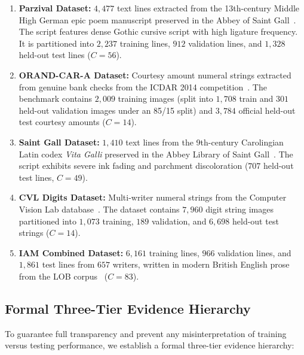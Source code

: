 \documentclass{IEEEtran}
\begin{document}
\begin{enumerate}

    \item \textbf{Parzival Dataset:} $4,477$ text lines extracted from the 13th-century Middle High German epic poem manuscript preserved in the Abbey of Saint Gall~\cite{fischer2012groundtruth}. The script features dense Gothic cursive script with high ligature frequency. It is partitioned into $2,237$ training lines, $912$ validation lines, and $1,328$ held-out test lines ($C=56$).

    \item \textbf{ORAND-CAR-A Dataset:} Courtesy amount numeral strings extracted from genuine bank checks from the ICDAR 2014 competition~\cite{koerich2014}. The benchmark contains $2,009$ training images (split into $1,708$ train and $301$ held-out validation images under an 85/15 split) and $3,784$ official held-out test courtesy amounts ($C=14$).

    \item \textbf{Saint Gall Dataset:} $1,410$ text lines from the 9th-century Carolingian Latin codex \emph{Vita Galli} preserved in the Abbey Library of Saint Gall~\cite{fischer2011transcription}. The script exhibits severe ink fading and parchment discoloration ($707$ held-out test lines, $C=49$).

    \item \textbf{CVL Digits Dataset:} Multi-writer numeral strings from the Computer Vision Lab database~\cite{kleber2013cvl}. The dataset contains $7,960$ digit string images partitioned into $1,073$ training, $189$ validation, and $6,698$ held-out test strings ($C=14$).

    \item \textbf{IAM Combined Dataset:} $6,161$ training lines, $966$ validation lines, and $1,861$ test lines from $657$ writers, written in modern British English prose from the LOB corpus~\cite{marti2002iam} ($C=83$).

\end{enumerate}

\subsection{Formal Three-Tier Evidence Hierarchy}

To guarantee full transparency and prevent any misinterpretation of training versus testing performance, we establish a formal three-tier evidence hierarchy:
\end{document}
